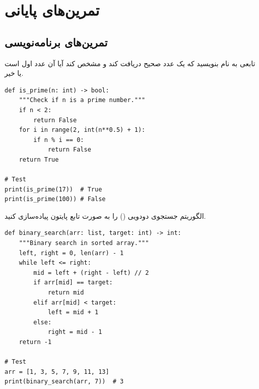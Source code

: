 \documentclass{matinbook}
\begin{document}
\chapter{تمرین‌های پایانی}
\label{chap:exercises}

\section{تمرین‌های برنامه‌نویسی}

\begin{exercise}
    تابعی به نام  بنویسید
    که یک عدد صحیح دریافت کند و مشخص کند
    آیا آن عدد اول است یا خیر.
    \label{exc:is-prime}
\end{exercise}

\begin{solution}
    \begin{latin}
\begin{verbatim}
def is_prime(n: int) -> bool:
    """Check if n is a prime number."""
    if n < 2:
        return False
    for i in range(2, int(n**0.5) + 1):
        if n % i == 0:
            return False
    return True

# Test
print(is_prime(17))  # True
print(is_prime(100)) # False
\end{verbatim}
    \end{latin}
\end{solution}

\begin{exercise}
    الگوریتم جستجوی دودویی ()
    را به صورت تابع پایتون پیاده‌سازی کنید.
    \label{exc:binary-search}
\end{exercise}

\begin{solution}
    \begin{latin}
\begin{verbatim}
def binary_search(arr: list, target: int) -> int:
    """Binary search in sorted array."""
    left, right = 0, len(arr) - 1
    while left <= right:
        mid = left + (right - left) // 2
        if arr[mid] == target:
            return mid
        elif arr[mid] < target:
            left = mid + 1
        else:
            right = mid - 1
    return -1

# Test
arr = [1, 3, 5, 7, 9, 11, 13]
print(binary_search(arr, 7))  # 3
\end{verbatim}
    \end{latin}
\end{solution}
\end{document}
